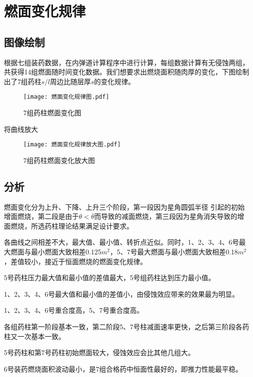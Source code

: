 
\chapter{燃面变化规律}
\section{图像绘制}

根据七组装药数据，在内弹道计算程序中进行计算，每组数据计算有无侵蚀两组，共获得14组燃面随时间变化数据。我们想要求出燃烧面积随肉厚的变化，下图绘制出了7组药柱$s/l$周边比随层厚$s$的变化规律。

\begin{figure}
  \centering
  \texttt{[image: 燃面变化规律图.pdf]}

  \caption{7组药柱燃面变化图}
  \label{fig:example}
\end{figure}

将曲线放大
\begin{figure}
    \centering
    \texttt{[image: 燃面变化规律放大图.pdf]}

    \caption{7组药柱燃面变化放大图}
    \label{fig:example}
  \end{figure}

\section{分析}
燃面变化分为上升、下降、上升三个阶段，第一段因为星角圆弧半径
引起的初始增面燃烧，第二段是由于$\theta < \overline{\theta }$而导致的减面燃烧，第三段因为星角消失导致的增面燃烧，所选药柱理论结果满足设计要求。

各曲线之间相差不大，最大值、最小值、转折点近似。同时，1、2、3、4、6号最大燃面与最小燃面大致相差0.125$m^2$，5、7号最大燃面与最小燃面大致相差0.18$m^2$，差值较小，接近于恒面燃烧的燃面变化规律。

5号药柱压力最大值和最小值的差值最大，5号组药柱达到压力最小值。

1、2、3、4、6号最大值和最小值的差值小，由侵蚀效应带来的效果最为明显。

1、2、3、4、6号重合度高，5、7号重合度高。

各组药柱第一阶段基本一致，第二阶段5、7号柱减面速率更快，之后第三阶段各药柱又一次基本一致。

5号药柱和第7号药柱初始燃面较大，侵蚀效应会比其他几组大。

6号装药燃烧面积波动最小，是7组合格药中恒面性最好的，即推力性能最平稳。